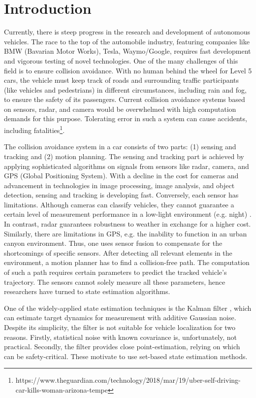 \chapter{Introduction} \label{ch:intro}
Currently, there is steep progress in the research and development of autonomous vehicles. The race to the top of the automobile industry, featuring companies like BMW (Bavarian Motor Works), Tesla, Waymo/Google, requires fast development and vigorous testing of novel technologies. One of the many challenges of this field is to ensure collision avoidance. With no human behind the wheel for Level 5 \cite{SAE2014} cars, the vehicle must keep track of roads and surrounding traffic participants (like vehicles and pedestrians) in different circumstances, including rain and fog, to ensure the safety of its passengers. Current collision avoidance systems based on sensors, radar, and camera would be overwhelmed with high computation demands for this purpose. Tolerating error in such a system can cause accidents, including fatalities\footnote{https://www.theguardian.com/technology/2018/mar/19/uber-self-driving-car-kills-woman-arizona-tempe}.


The collision avoidance system in a car consists of two parts: (1) sensing and tracking and (2) motion planning. The sensing and tracking part is achieved by applying sophisticated algorithms on signals from sensors like radar, camera, and GPS (Global Positioning System). With a decline in the cost for cameras and advancement in technologies in image processing, image analysis, and object detection, sensing and tracking is developing fast. Conversely, each sensor has limitations. Although cameras can classify vehicles, they cannot guarantee a certain level of measurement performance in a low-light environment (e.g. night) \cite{Hirz2018}. In contrast, radar guarantees robustness to weather in exchange for a higher cost. Similarly, there are limitations in GPS, e.g. the inability to function in an urban canyon environment. Thus, one uses sensor fusion to compensate for the shortcomings of specific sensors. After detecting all relevant elements in the environment, a motion planner has to find a collision-free path. The computation of such a path requires certain parameters to predict the tracked vehicle's trajectory. The sensors cannot solely measure all these parameters, hence researchers have turned to state estimation algorithms.

One of the widely-applied state estimation techniques is the Kalman filter \cite{Kalman}, which can estimate target dynamics for measurement with additive Gaussian noise. Despite its simplicity, the filter is not suitable for vehicle localization for two reasons. Firstly, statistical noise with known covariance is, unfortunately, not practical. Secondly, the filter provides close point-estimation, relying on which can be safety-critical. These motivate to use set-based state estimation methods.


